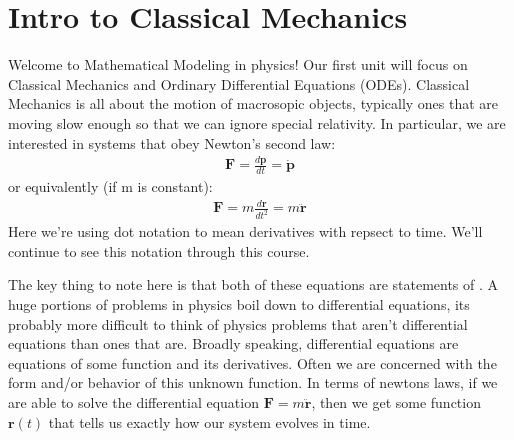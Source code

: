 \documentclass[letterpaper,10pt,english]{jupyterBook}
\begin{document}
\chapter{Intro to Classical Mechanics}
\label{\detokenize{content/1_mechanics/mechanics_intro:intro-to-classical-mechanics}}\label{\detokenize{content/1_mechanics/mechanics_intro::doc}}
\sphinxAtStartPar
Welcome to Mathematical Modeling in physics! Our first unit will focus on Classical Mechanics and Ordinary Differential Equations (ODEs). Classical Mechanics is all about the motion of macrosopic objects, typically ones that are moving slow enough so that we can ignore special relativity. In particular, we are interested in systems that obey Newton’s second law:
\begin{equation*}
\begin{split}\mathbf{F} = \frac{d\mathbf{p}}{dt} = \dot{\mathbf{p}}\end{split}
\end{equation*}
\sphinxAtStartPar
or equivalently (if m is constant):
\begin{equation*}
\begin{split}\mathbf{F} = m \frac{d\mathbf{r}}{dt^2} = m\ddot{\mathbf{r}}\end{split}
\end{equation*}
\sphinxAtStartPar
Here we’re using dot notation to mean derivatives with repsect to time. We’ll continue to see this notation through this course.

\sphinxAtStartPar
The key thing to note here is that both of these equations are statements of . A huge portions of problems in physics boil down to differential equations, its probably more difficult to think of physics problems that aren’t differential equations than ones that are. Broadly speaking, differential equations are equations of some  function and its derivatives. Often we are concerned with the form and/or behavior of this unknown function. In terms of newtons laws, if we are able to solve the differential equation \(\mathbf{F} = m\ddot{\mathbf{r}}\), then we get some function \(\mathbf{r}(t)\) that tells us exactly how our system evolves in time.
\end{document}
